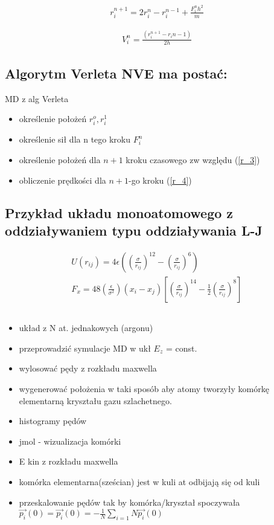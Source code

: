 \documentclass[a4paper,10pt]{article}
\begin{document}
\begin{gather} \label{r_3}
 r_i^{n+1} = 2r_i^n - r_i^{n-1} + \frac{F_i^n h^2}{m}
\end{gather}

\begin{gather} \label{r_4}
V_i^n = \frac{(r_i^{n+1} - r_i{n-1})}{2h}
\end{gather}

\subsection{Algorytm Verleta NVE ma postać:}
MD z alg Verleta
\begin{itemize}
 \item określenie położeń $r_i^o, r_i^1$
 \item określenie sił dla n tego kroku $F_i^n$
 \item określenie położeń dla $n+1$ kroku czasowego zw względu (\ref{r_3})
 \item obliczenie prędkości dla $n+1$-go kroku (\ref{r_4})
\end{itemize}

\subsection{Przykład układu monoatomowego z oddziaływaniem typu oddziaływania L-J}

\begin{gather*}
 U(r_{ij}) = 4\epsilon\left( \left(\frac{\sigma}{r_{ij}}\right)^{12} - \left(\frac{\sigma}{r_{ij}}\right)^6 \right) \\
 F_x = 48 \left( \frac{\epsilon}{\sigma^2} \right) (x_i - x_j) \left[\left(\frac{\sigma}{r_{ij}}\right)^{14} - \frac{1}{2} \left(\frac{\sigma}{r_{ij}}\right)^{8} \right]
\end{gather*}

\subsection{}
\begin{itemize}
 \item układ z N at. jednakowych (argonu)
 \item przeprowadzić symulacje MD w ukł $E_z$ = const.
 \item wylosować pędy z rozkładu maxwella
 \item wygenerować położenia w taki sposób aby atomy tworzyły komórkę elementarną kryształu gazu szlachetnego.
 \item histogramy pędów
 \item jmol - wizualizacja komórki
 \item E kin z rozkładu maxwella
 \item komórka elementarna(sześcian) jest w kuli at odbijają się od kuli
 \item przeskalowanie pędów tak by komórka/kryształ spoczywała $\vec{p_i}(0) = \vec{p_i}(0) = - \frac{1}{N}\sum_{i=1}{N}\vec{p_i}(0)$
\end{itemize}
\end{document}
